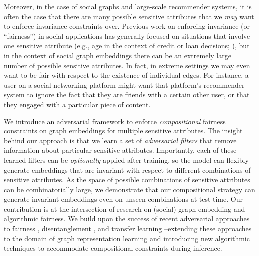 Moreover, in the case of social graphs and large-scale recommender systems, it is often the case that there are many  possible sensitive attributes that we {\em may} want to enforce invariance constraints over.
Previous work on enforcing invariance (or ``fairness'') in social applications has generally focused on situations that involve one sensitive attribute (e.g., age in the context of credit or loan decisions; \citet{zemel2013learning}), but in the context of social graph embeddings there can be an extremely large number of possible sensitive attributes. In fact, in extreme settings we may even want to be fair with respect to the existence of individual edges.
For instance, a user on a social networking platform might want that platform's recommender system to ignore the fact that they are friends with a certain other user, or that they engaged with a particular piece of content. 

We introduce an adversarial framework to enforce {\em compositional} fairness constraints on graph embeddings for multiple sensitive attributes.
The insight behind our approach is that we learn a set of {\em adversarial filters} that remove information about particular sensitive attributes.
Importantly, each of these learned filters can be {\em optionally} applied after training, so the model can flexibly generate embeddings that are invariant with respect to different combinations of sensitive attributes. As the space of possible combinations of sensitive attributes can be combinatorially large, we demonstrate that our compositional strategy can generate invariant embeddings even on unseen combinations at test time. Our contribution is at the intersection of research on (social) graph embedding and algorithmic fairness.
We build upon the success of recent adversarial approaches to fairness \cite{edwards2015censoring}, disentanglement \cite{mathieu2016disentangling}, and transfer learning \cite{madras2018learning}--extending these approaches to the domain of graph representation learning and introducing new algorithmic techniques to accommodate compositional constraints during inference. 

